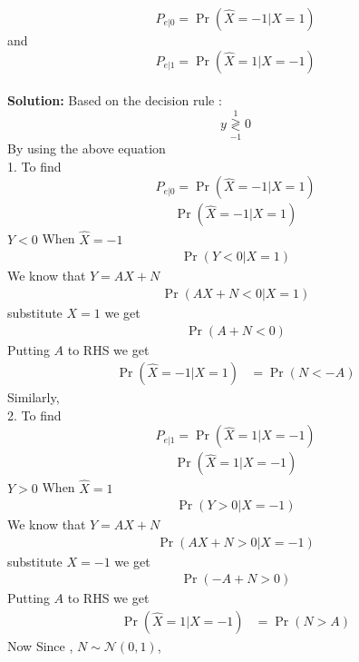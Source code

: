 \documentclass[journal,15pt,twocolumn]{IEEEtran}
\providecommand{\pr}[1]{\ensuremath{\Pr\left(#1\right)}}
\newcommand{\solution}{\noindent \textbf{Solution: }}
\providecommand{\dec}[2]{\ensuremath{\overset{#1}{\underset{#2}{\gtrless}}}}
\providecommand{\gauss}[2]{\mathcal{N}\ensuremath{\left(#1,#2\right)}}
\begin{document}
\begin{enumerate}
\begin{equation}
	P_{e|0} = \pr{\hat{X} = -1|X=1}
\end{equation}
and 
\begin{equation}
	P_{e|1} = \pr{\hat{X} = 1|X=-1}
\end{equation}\\
\solution Based on the decision rule :
\begin{equation}
y \dec{1}{-1} 0
\end{equation}
By using the above  equation\\
1. To find \begin{equation}
	P_{e|0} = \pr{\hat{X} = -1|X=1}
\end{equation}
\begin{align}
	\pr{\hat{X} = -1|X=1} 
  \end{align}
$Y < 0$ When $\hat{X} = -1$ 
 \begin{align}
        \pr{Y < 0|X=1} 
 \end{align}
         We know that $Y=AX+N$ 
\begin{align}
	 \pr{AX + N < 0|X=1}
\end{align}
  substitute $X=1$ we get
  \begin{align}
	\pr{A + N < 0}
 \end{align}
  Putting $A$ to RHS we get
  \begin{align}
	\pr{\hat{X} = -1|X=1} &= \pr{N < -A}
   \end{align} \vspace{2mm}
Similarly, \\
2. To find \begin{equation}
	P_{e|1} = \pr{\hat{X} = 1|X=-1}
\end{equation}
\begin{align}
	\pr{\hat{X} = 1|X=-1} 
  \end{align}
$Y > 0$ When $\hat{X} = 1$ 
 \begin{align}
        \pr{Y > 0|X=-1} 
 \end{align}
         We know that $Y=AX+N$ 
\begin{align}
	 \pr{AX + N > 0|X=-1}
\end{align}
  substitute $X=-1$ we get
  \begin{align}
	\pr{-A + N > 0}
 \end{align}
  Putting $A$ to RHS we get
  \begin{align}
	\pr{\hat{X} = 1|X=-1} &= \pr{N > A}
   \end{align} \vspace{2mm}
Now Since , $N \sim \gauss{0}{1}$,
\begin{align}

\end{align}
\end{enumerate}
\end{document}
